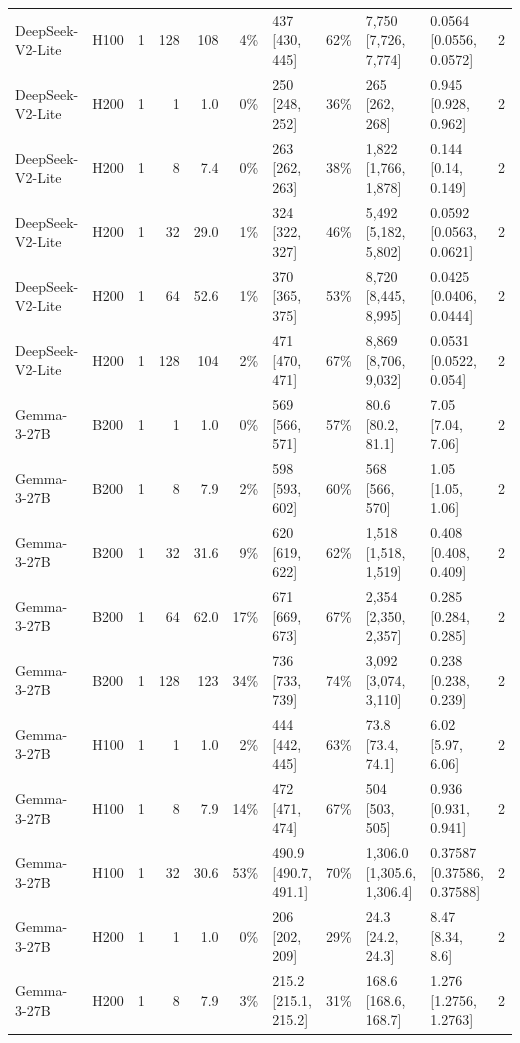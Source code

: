 \begin{landscape}
\begin{longtable}{llrrrrlrllr}
DeepSeek-V2-Lite & H100 & 1 & 128 & 108 & 4\% & 437 {[}430, 445{]} & 62\% & 7,750 {[}7,726, 7,774{]} & 0.0564 {[}0.0556, 0.0572{]} & 2 \\
DeepSeek-V2-Lite & H200 & 1 & 1 & 1.0 & 0\% & 250 {[}248, 252{]} & 36\% & 265 {[}262, 268{]} & 0.945 {[}0.928, 0.962{]} & 2 \\
DeepSeek-V2-Lite & H200 & 1 & 8 & 7.4 & 0\% & 263 {[}262, 263{]} & 38\% & 1,822 {[}1,766, 1,878{]} & 0.144 {[}0.14, 0.149{]} & 2 \\
DeepSeek-V2-Lite & H200 & 1 & 32 & 29.0 & 1\% & 324 {[}322, 327{]} & 46\% & 5,492 {[}5,182, 5,802{]} & 0.0592 {[}0.0563, 0.0621{]} & 2 \\
DeepSeek-V2-Lite & H200 & 1 & 64 & 52.6 & 1\% & 370 {[}365, 375{]} & 53\% & 8,720 {[}8,445, 8,995{]} & 0.0425 {[}0.0406, 0.0444{]} & 2 \\
DeepSeek-V2-Lite & H200 & 1 & 128 & 104 & 2\% & 471 {[}470, 471{]} & 67\% & 8,869 {[}8,706, 9,032{]} & 0.0531 {[}0.0522, 0.054{]} & 2 \\
Gemma-3-27B & B200 & 1 & 1 & 1.0 & 0\% & 569 {[}566, 571{]} & 57\% & 80.6 {[}80.2, 81.1{]} & 7.05 {[}7.04, 7.06{]} & 2 \\
Gemma-3-27B & B200 & 1 & 8 & 7.9 & 2\% & 598 {[}593, 602{]} & 60\% & 568 {[}566, 570{]} & 1.05 {[}1.05, 1.06{]} & 2 \\
Gemma-3-27B & B200 & 1 & 32 & 31.6 & 9\% & 620 {[}619, 622{]} & 62\% & 1,518 {[}1,518, 1,519{]} & 0.408 {[}0.408, 0.409{]} & 2 \\
Gemma-3-27B & B200 & 1 & 64 & 62.0 & 17\% & 671 {[}669, 673{]} & 67\% & 2,354 {[}2,350, 2,357{]} & 0.285 {[}0.284, 0.285{]} & 2 \\
Gemma-3-27B & B200 & 1 & 128 & 123 & 34\% & 736 {[}733, 739{]} & 74\% & 3,092 {[}3,074, 3,110{]} & 0.238 {[}0.238, 0.239{]} & 2 \\
Gemma-3-27B & H100 & 1 & 1 & 1.0 & 2\% & 444 {[}442, 445{]} & 63\% & 73.8 {[}73.4, 74.1{]} & 6.02 {[}5.97, 6.06{]} & 2 \\
Gemma-3-27B & H100 & 1 & 8 & 7.9 & 14\% & 472 {[}471, 474{]} & 67\% & 504 {[}503, 505{]} & 0.936 {[}0.931, 0.941{]} & 2 \\
Gemma-3-27B & H100 & 1 & 32 & 30.6 & 53\% & 490.9 {[}490.7, 491.1{]} & 70\% & 1,306.0 {[}1,305.6, 1,306.4{]} & 0.37587 {[}0.37586, 0.37588{]} & 2 \\
Gemma-3-27B & H200 & 1 & 1 & 1.0 & 0\% & 206 {[}202, 209{]} & 29\% & 24.3 {[}24.2, 24.3{]} & 8.47 {[}8.34, 8.6{]} & 2 \\
Gemma-3-27B & H200 & 1 & 8 & 7.9 & 3\% & 215.2 {[}215.1, 215.2{]} & 31\% & 168.6 {[}168.6, 168.7{]} & 1.276 {[}1.2756, 1.2763{]} & 2 \\

\end{longtable}
\end{landscape}
